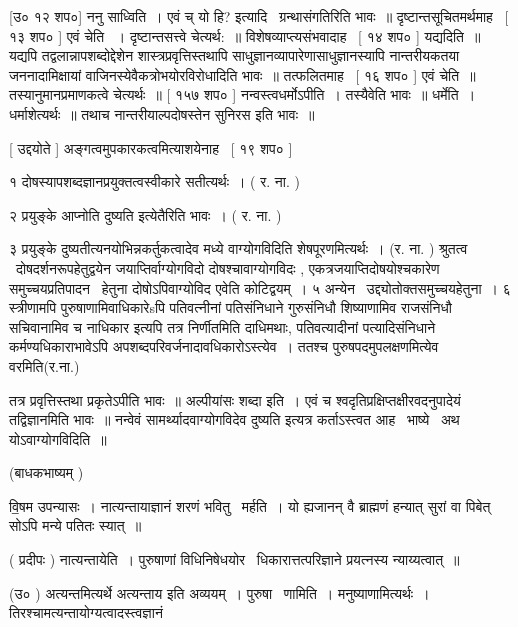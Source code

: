 \documentclass[11pt, openany]{book}
\begin{document}
 [उ० १२ शप०] ननु साध्विति~। एवं च् {\qt यो हि? इत्यादि} \textendash\ 
ग्रन्थासंगतिरिति भावः~॥ दृष्टान्तसूचितमर्थमाह \textendash\ [ १३ शप० ] एवं चेति
~। दृष्टान्तसत्त्वे चेत्यर्थ:~॥ विशेषव्याप्त्यसंभवादाह \textendash\ [ १४ शप० ]
यद्यदिति~॥ यद्यपि तद्वलान्नापशब्दोद्देशेन शास्त्रप्रवृत्तिस्तथापि
साधुज्ञानव्यापारेणासाधुज्ञानस्यापि नान्तरीयकतया जननादामिक्षायां
वाजिनस्येवैकत्रोभयोरविरोधादिति भावः~॥ तत्फलितमाह \textendash\ [ १६ शप० ] एवं
चेति~॥ तस्यानुमानप्रमाणकत्वे चेत्यर्थः~॥ [ १५७ शप० ]
नन्वस्त्वधर्मोऽपीति~। तस्यैवेति भावः~॥ धर्मेति~। धर्माशेत्यर्थः~॥ तथाच
नान्तरीयाल्पदोषस्तेन सुनिरस इति भावः~॥ 

 [ उद्दयोते ] अङ्गत्वमुपकारकत्वमित्याशयेनाह \textendash\ [ १९ शप० ] 



१ दोषस्यापशब्दज्ञानप्रयुक्तत्वस्वीकारे सतीत्यर्थः~। ( र. ना. ) 

२ प्रयुङ्के आप्नोति दुष्यति इत्येतैरिति भावः~। ( र. ना. ) 

३ प्रयुङ्के दुष्यतीत्यनयोभिन्नकर्तुकत्वादेव मध्ये वाग्योगविदिति
शेषपूरणमित्यर्थः~। (र. ना. ) श्रुतत्व \textendash\ दोषदर्शनरूपहेतुद्वयेन
जयाप्तिर्वाग्योगविदो दोषश्चावाग्योगविदः , एकत्रजयाप्तिदोषयोश्चकारेण
समुच्चयप्रतिपादन \textendash\ हेतुना दोषोऽपिवाग्योविद एवेति कोटिद्वयम्~। ५
अन्येन \textendash\ उद्द्योतोक्तसमुच्चयहेतुना~। ६ स्त्रीणामपि पुरुषाणामिवाधिकारेsपि
पतिवत्नीनां पतिसंनिधाने गुरुसंनिधौ शिष्याणामिव राजसंनिधौ सचिवानामिव च
नाधिकार इत्यपि तत्र निर्णीतमिति दाधिमथाः, पतिवत्यादीनां पत्यादिसंनिधाने
कर्मण्यधिकाराभावेऽपि अपशब्दपरिवर्जनादावधिकारोऽस्त्येव~। ततश्च
पुरुषपदमुपलक्षणमित्येव वरमिति(र.ना.)





तत्र प्रवृत्तिस्तथा प्रकृतेऽपीति भावः~॥ अल्पीयांसः शब्दा इति~। एवं च
श्वदृतिप्रक्षिप्तक्षीरवदनुपादेयं तद्विज्ञानमिति भावः~॥ नन्वेवं
सामर्थ्यादवाग्योगविदेव {\qt दुष्यति} इत्यत्र कर्ताऽस्त्वत आह \textendash\ भाष्ये \textendash\ अथ
योऽवाग्योगविदिति~॥ 

 (बाधकभाष्यम् ) 

 वि॒षम उपन्यासः~। नात्यन्तायाज्ञानं शरणं भवितु \textendash\ मर्हति~। यो ह्यजानन् वै
ब्राह्मणं हन्यात् सुरां वा पिबेत् सोऽपि मन्ये पतितः स्यात्~॥ 

 ( प्रदीपः ) नात्यन्तायेति~। पुरुषाणां विधिनिषेधयोर \textendash\ 
धिकारात्तत्परिज्ञाने प्रयत्नस्य न्याय्यत्वात्~॥ 

 (उ० ) अत्यन्तमित्यर्थे {\qt अत्यन्ताय} इति अव्ययम्~। पुरुषा \textendash\ णामिति~। 
मनुष्याणामित्यर्थः~। तिरश्चामत्यन्तायोग्यत्वादस्त्वज्ञानं 
\end{document}
